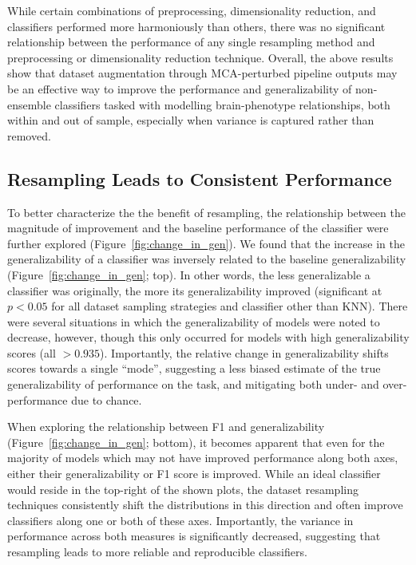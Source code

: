 \documentclass[10pt]{SelfArx} %
\begin{document}
While certain combinations of preprocessing, dimensionality reduction, and classifiers performed more harmoniously than
others, there was no significant relationship between the performance of any single resampling method and preprocessing
or dimensionality reduction technique. Overall, the above results show that dataset augmentation through MCA-perturbed
pipeline outputs may be an effective way to improve the performance and generalizability of non-ensemble classifiers
tasked with modelling brain-phenotype relationships, both within and out of sample, especially when variance is captured
rather than removed.

\subsection*{Resampling Leads to Consistent Performance}

To better characterize the the benefit of resampling, the relationship between the magnitude of improvement and the
baseline performance of the classifier were further explored (Figure~\ref{fig:change_in_gen}). We found that the
increase in the generalizability of a classifier was inversely related to the baseline generalizability
(Figure~\ref{fig:change_in_gen}; top). In other words, the less generalizable a classifier was originally, the more its
generalizability improved (significant at $p < 0.05$ for all dataset sampling strategies and classifier other than
KNN). There were several situations in which the generalizability of models were noted to decrease, however, though
this only occurred for models with high generalizability scores (all $>0.935$). Importantly, the relative change in
generalizability shifts scores towards a single ``mode'', suggesting a less biased estimate of the true
generalizability of performance on the task, and mitigating both under- and over-performance due to chance.

When exploring the relationship between F1 and generalizability (Figure~\ref{fig:change_in_gen}; bottom), it becomes
apparent that even for the majority of models which may not have improved performance along both axes, either their
generalizability or F1 score is improved. While an ideal classifier would reside in the top-right of the shown plots,
the dataset resampling techniques consistently shift the distributions in this direction and often improve classifiers
along one or both of these axes. Importantly, the variance in performance across both measures is significantly
decreased, suggesting that resampling leads to more reliable and reproducible classifiers.
\end{document}
